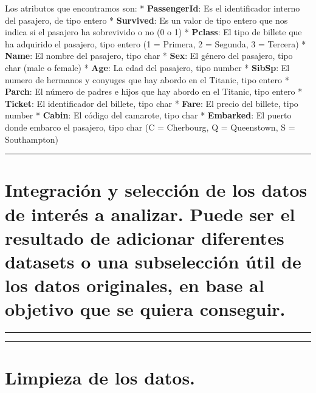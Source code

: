 \documentclass[
]{article}
\begin{document}
Los atributos que encontramos son: * \textbf{PassengerId}: Es el
identificador interno del pasajero, de tipo entero * \textbf{Survived}:
Es un valor de tipo entero que nos indica si el pasajero ha sobrevivido
o no (0 o 1) * \textbf{Pclass}: El tipo de billete que ha adquirido el
pasajero, tipo entero (1 = Primera, 2 = Segunda, 3 = Tercera) *
\textbf{Name}: El nombre del pasajero, tipo char * \textbf{Sex}: El
género del pasajero, tipo char (male o female) * \textbf{Age}: La edad
del pasajero, tipo number * \textbf{SibSp}: El numero de hermanos y
conyuges que hay abordo en el Titanic, tipo entero * \textbf{Parch}: El
número de padres e hijos que hay abordo en el Titanic, tipo entero *
\textbf{Ticket}: El identificador del billete, tipo char *
\textbf{Fare}: El precio del billete, tipo number * \textbf{Cabin}: El
código del camarote, tipo char * \textbf{Embarked}: El puerto donde
embarco el pasajero, tipo char (C = Cherbourg, Q = Queenstown, S =
Southampton)

\begin{center}\rule{0.5\linewidth}{0.5pt}\end{center}

\hypertarget{integraciuxf3n-y-selecciuxf3n-de-los-datos-de-interuxe9s-a-analizar.-puede-ser-el-resultado-de-adicionar-diferentes-datasets-o-una-subselecciuxf3n-uxfatil-de-los-datos-originales-en-base-al-objetivo-que-se-quiera-conseguir.}{%
\section{Integración y selección de los datos de interés a analizar.
Puede ser el resultado de adicionar diferentes datasets o una
subselección útil de los datos originales, en base al objetivo que se
quiera
conseguir.}\label{integraciuxf3n-y-selecciuxf3n-de-los-datos-de-interuxe9s-a-analizar.-puede-ser-el-resultado-de-adicionar-diferentes-datasets-o-una-subselecciuxf3n-uxfatil-de-los-datos-originales-en-base-al-objetivo-que-se-quiera-conseguir.}}

\begin{center}\rule{0.5\linewidth}{0.5pt}\end{center}

\begin{center}\rule{0.5\linewidth}{0.5pt}\end{center}

\hypertarget{limpieza-de-los-datos.}{%
\section{Limpieza de los datos.}\label{limpieza-de-los-datos.}}
\end{document}
